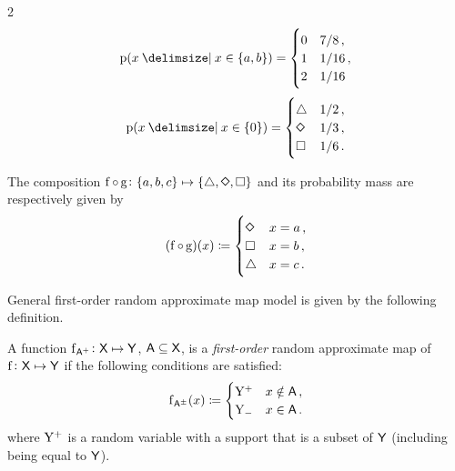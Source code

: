 \documentclass[11pt,final,hidelinks]{article}
\newcommand{\mathlg}[1]{\mathlarger{\mathlarger{\mathlarger{#1}}}}
\begin{document}
{\begin{example}
	\begin{multicols}{2}
		\noindent
		\begin{equation}
		\Fun{p}(x \Given x \in \{a,b\}) =
		\begin{cases}
		0	&	7/8\,,\\
		1	&	1/16\,,\\
		2	&	1/16
		\end{cases}
		\end{equation}
		\begin{equation}
		\Fun{p}(x \Given x \in \{0\}) =
		\begin{cases}
		\triangle			&	1/2\,,\\
		\mathlg{\diamond}	&	1/3\,,\\
		\square				&	1/6\,.
		\end{cases}
		\end{equation}
	\end{multicols}

	
	The composition $\Fun{f} \circ \Fun{g} \colon \{a,b,c\} \mapsto \{\triangle,\mathlg{\diamond},\square\}$ and its probability mass are respectively given by
	\begin{equation}
	(\Fun{f} \circ \Fun{g})(x) \coloneqq
	\begin{cases}
	\mathlg{\diamond}	&	x = a\,,\\
	\square				&	x = b\,,\\
	\triangle			&	x = c\,.
	\end{cases}
	\end{equation}
	
\end{example}
}









General first-order random approximate map model is given by the following definition.
\begin{definition}
A function $\Fun{f}[\PAT{\Set{A}}] \colon \Set{X} \mapsto \Set{Y}$, $\Set{A} \subseteq \Set{X}$, is a \emph{first-order} random approximate map of $\Fun{f} \colon \Set{X} \mapsto \Set{Y}$ if the following conditions are satisfied:
\begin{equation}
\Fun{f}[\AT{\Set{A}}](x) \coloneqq
	\begin{cases}
		\RV{Y^{+}}		&	x \notin \Set{A}\,,\\
		\RV{Y_{-}}		&	x \in \Set{A}\,.
	\end{cases}
\end{equation}
where $\mathrm{Y^{+}}$ is a random variable with a support that is a subset of $\Set{Y}$ (including being equal to $\Set{Y}$).
\end{definition}
\end{document}
